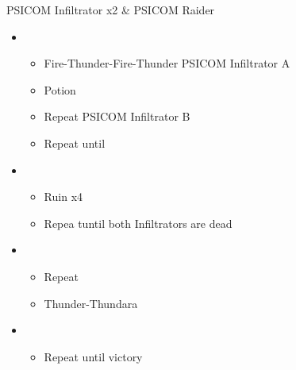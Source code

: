 \documentclass{report}
\begin{document}
\begin{battle}{PSICOM Infiltrator x2 \& PSICOM Raider}
\begin{itemize}
    \item \fourth
    \begin{itemize}
        \item Fire-Thunder-Fire-Thunder PSICOM Infiltrator A
        \item Potion
        \item Repeat PSICOM Infiltrator B
        \item Repeat until \stagger
    \end{itemize}
    \item \fifth
    \begin{itemize}
        \item Ruin x4
        \item Repea tuntil both Infiltrators are dead
    \end{itemize}
    \item \fourth
    \begin{itemize}
        \item Repeat
        \item Thunder-Thundara
        \stagger
    \end{itemize}
    \item \fifth
    \begin{itemize}
        \item Repeat until victory
    \end{itemize}
\end{itemize}
 
\end{battle}



\end{document}
